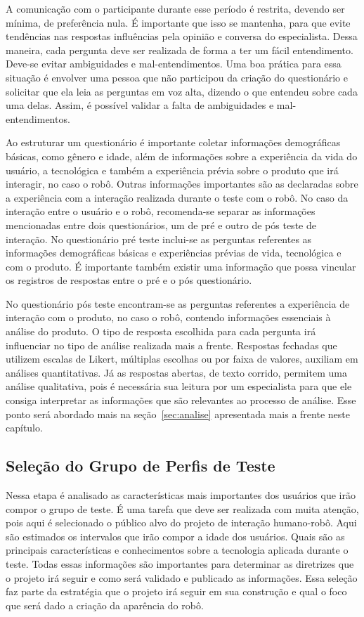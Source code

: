 A comunicação com o participante durante esse período é restrita, devendo ser mínima, de preferência nula. É importante que isso se mantenha, para que evite tendências nas respostas influências pela opinião e conversa do especialista. Dessa maneira, cada pergunta deve ser realizada de forma a ter um fácil entendimento. Deve-se evitar ambiguidades e mal-entendimentos. Uma boa prática para essa situação é envolver uma pessoa que não participou da criação do questionário e solicitar que ela leia as perguntas em voz alta, dizendo o que entendeu sobre cada uma delas. Assim, é possível validar a falta de ambiguidades e mal-entendimentos.

Ao estruturar um questionário é importante coletar informações demográficas básicas, como gênero e idade, além de informações sobre a experiência da vida do usuário, a tecnológica e também a experiência prévia sobre o produto que irá interagir, no caso o robô. Outras informações importantes são as declaradas sobre a experiência com a interação realizada durante o teste com o robô. No caso da interação entre o usuário e o robô, recomenda-se separar as informações mencionadas entre dois questionários, um de pré e outro de pós teste de interação. No questionário pré teste inclui-se as perguntas referentes as informações demográficas básicas e experiências prévias de vida, tecnológica e com o produto. É importante também existir uma informação que possa vincular os registros de respostas entre o pré e o pós questionário.

No questionário pós teste encontram-se as perguntas referentes a experiência de interação com o produto, no caso o robô, contendo informações essenciais à análise do produto. O tipo de resposta escolhida para cada pergunta irá influenciar no tipo de análise realizada mais a frente. Respostas fechadas que utilizem escalas de Likert, múltiplas escolhas ou por faixa de valores, auxiliam em análises quantitativas. Já as respostas abertas, de texto corrido, permitem uma análise qualitativa, pois é necessária sua leitura por um especialista para que ele consiga interpretar as informações que são relevantes ao processo de análise. Esse ponto será abordado mais na seção~\ref{sec:analise} apresentada mais a frente neste capítulo. 

\subsection{Seleção do Grupo de Perfis de Teste}
\label{sec:selecaoperfis}
Nessa etapa é analisado as características mais importantes dos usuários que irão compor o grupo de teste. É uma tarefa que deve ser realizada com muita atenção, pois aqui é selecionado o público alvo do projeto de interação humano-robô. Aqui são estimados os intervalos que irão compor a idade dos usuários. Quais são as principais características e conhecimentos sobre a tecnologia aplicada durante o teste. Todas essas informações são importantes para determinar as diretrizes que o projeto irá seguir e como será validado e publicado as informações. Essa seleção faz parte da estratégia que o projeto irá seguir em sua construção e qual o foco que será dado a criação da aparência do robô.

